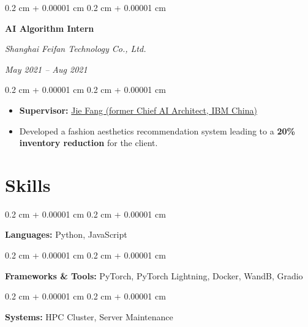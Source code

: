 \documentclass[10pt, letterpaper]{article}
\newenvironment{highlights}{
    \begin{itemize}[
        topsep=0.05 cm,
        parsep=0.05 cm,
        partopsep=0pt,
        itemsep=0pt,
        leftmargin=0.4 cm + 10pt
    ]
}{
    \end{itemize}
} %
\newenvironment{onecolentry}{
    \begin{adjustwidth}{
        0.2 cm + 0.00001 cm
    }{
        0.2 cm + 0.00001 cm
    }
}{
    \end{adjustwidth}
} %
\newenvironment{twocolentry}[2][]{
    \onecolentry
    \def\secondColumn{#2}
    \setcolumnwidth{\fill, 4.5 cm}
    \begin{paracol}{2}
}{
    \switchcolumn \raggedleft \secondColumn
    \end{paracol}
    \endonecolentry
} %
\begin{document}
    \vspace{0.1cm}

    \begin{twocolentry}{
        \textit{May 2021 – Aug 2021}
    }
        \textbf{AI Algorithm Intern}
        
        \textit{Shanghai Feifan Technology Co., Ltd.}
    \end{twocolentry}
    \begin{onecolentry}
        \begin{highlights}
            \item \textbf{Supervisor:} \href{https://www.linkedin.com/in/jie-fang-28293740}{Jie Fang (former Chief AI Architect, IBM China)}
            \item Developed a fashion aesthetics recommendation system leading to a \textbf{20\% inventory reduction} for the client.
        \end{highlights}
    \end{onecolentry}
    
    \section{Skills}
        \begin{onecolentry}
            \textbf{Languages:} Python, JavaScript
        \end{onecolentry}
        \begin{onecolentry}
            \textbf{Frameworks \& Tools:} PyTorch, PyTorch Lightning, Docker, WandB, Gradio
        \end{onecolentry}
        \begin{onecolentry}
            \textbf{Systems:} HPC Cluster, Server Maintenance
        \end{onecolentry}
\end{document}
